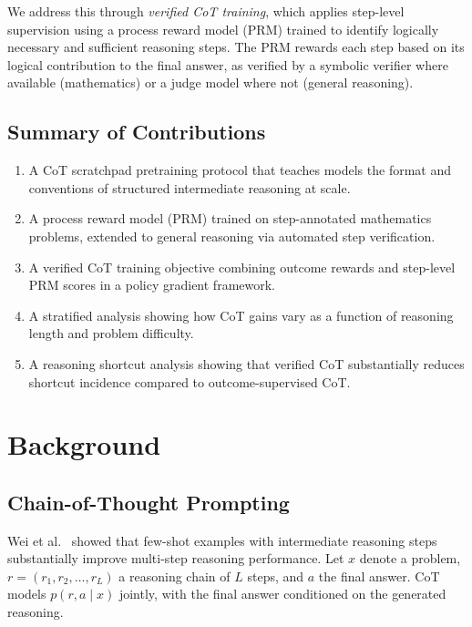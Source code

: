 \documentclass[11pt,a4paper]{article}
\begin{document}
We address this through \emph{verified CoT training}, which applies step-level
supervision using a process reward model (PRM) trained to identify logically necessary
and sufficient reasoning steps. The PRM rewards each step based on its logical
contribution to the final answer, as verified by a symbolic verifier where available
(mathematics) or a judge model where not (general reasoning).

\subsection{Summary of Contributions}

\begin{enumerate}
    \item A CoT scratchpad pretraining protocol that teaches models the format and
          conventions of structured intermediate reasoning at scale.
    \item A process reward model (PRM) trained on step-annotated mathematics problems,
          extended to general reasoning via automated step verification.
    \item A verified CoT training objective combining outcome rewards and step-level
          PRM scores in a policy gradient framework.
    \item A stratified analysis showing how CoT gains vary as a function of reasoning
          length and problem difficulty.
    \item A reasoning shortcut analysis showing that verified CoT substantially reduces
          shortcut incidence compared to outcome-supervised CoT.
\end{enumerate}

\section{Background}
\label{sec:background}

\subsection{Chain-of-Thought Prompting}

Wei et al.~\cite{wei2022cot} showed that few-shot examples with intermediate reasoning
steps substantially improve multi-step reasoning performance. Let $x$ denote a problem,
$r = (r_1, r_2, \ldots, r_L)$ a reasoning chain of $L$ steps, and $a$ the final answer.
CoT models $p(r, a \mid x)$ jointly, with the final answer conditioned on the generated
reasoning.
\end{document}
